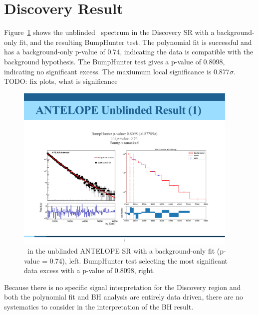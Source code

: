 \clearpage
\section{Discovery Result}
\label{sec:results_svj}
Figure~\ref{fig:unblinded_antelope_masked} shows the unblinded \mt~spectrum in the Discovery SR with a background-only fit, and the resulting BumpHunter test.
The polynomial fit is successful and has a background-only p-value of 0.74, indicating the data is compatible with the background hypothesis. 
The BumpHunter test gives a p-value of 0.8098, indicating no significant excess.
The maxiumum local significance is 0.877$\sigma$. 
TODO: fix plots, what is significance
\begin{figure}[!htbp]
\centering
   \includegraphics[width=0.95\textwidth]{figures/results/unblinded_antelope_unmasked}
    \caption{\mt~in the unblinded ANTELOPE SR with a background-only fit (p-value = 0.74), left. BumpHunter test selecting the most significant data excess with a p-value of 0.8098, right.
    \label{fig:unblinded_antelope_masked}}
\end{figure}

Because there is no specific signal interpretation for the Discovery region and both the polynomial fit and BH analysis are entirely data driven, there are no systematics to consider in the interpretation of the BH result.

